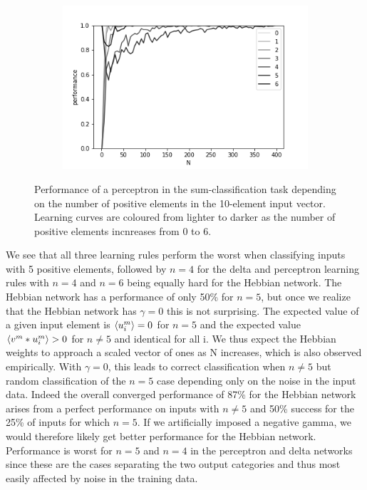 \documentclass{article}
\begin{document}
\begin{figure}[h]
\begin{subfigure}[t]{0.32\linewidth}
	\end{subfigure}%
	\hspace{0.01 \linewidth}
	\begin{subfigure}[t]{0.32\linewidth}
		\centering
		\includegraphics[width = 1.0\linewidth, trim={10 5 40 30}, clip=true]{figures/nplus_delta.png}
	\end{subfigure}%
\caption{Performance of a perceptron in the sum-classification task depending on the number of positive elements in the 10-element input vector. Learning curves are coloured from lighter to darker as the number of positive elements incnreases from 0 to 6.}
\label{fig:nplus}
\end{figure}

\newpage

We see that all three learning rules perform the worst when classifying inputs with 5 positive elements, followed by $n=4$ for the delta and perceptron learning rules with $n=4$ and $n=6$ being equally hard for the Hebbian network. The Hebbian network has a performance of only 50\% for $n=5$, but once we realize that the Hebbian network has $\gamma=0$ this is not surprising. The expected value of a given input element is $\braket{u_i^m} = 0$ for $n=5$ and the expected value $\braket{v^m*u_i^m} > 0$ for $n \neq 5$ and identical for all i. We thus expect the Hebbian weights to approach a scaled vector of ones as N increases, which is also observed empirically. With $\gamma = 0$, this leads to correct classification when $n \neq 5$ but random classification of the $n=5$ case depending only on the noise in the input data. Indeed the overall converged performance of 87\% for the Hebbian network arises from a perfect performance on inputs with $n \neq 5$ and 50\% success for the 25\% of inputs for which $n=5$. If we artificially imposed a negative gamma, we would therefore likely get better performance for the Hebbian network. Performance is worst for $n=5$ and $n=4$ in the perceptron and delta networks since these are the cases separating the two output categories and thus most easily affected by noise in the training data.
\end{document}
